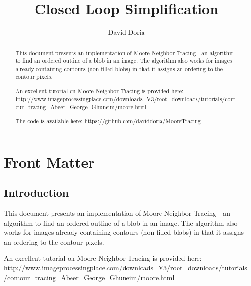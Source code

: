 \documentclass{InsightArticle}
\title{Closed Loop Simplification}
\author{David Doria}
\newcommand{\IJhandlerIDnumber}{3302}
\begin{document}
\IJhandlefooter{\IJhandlerIDnumber}


\ifpdf
\else
\fi


\maketitle


\ifhtml
\chapter*{Front Matter\label{front}}
\fi

\begin{abstract}
\noindent

This document presents an implementation of Moore Neighbor Tracing - an algorithm to find an ordered outline of a blob in an image. The algorithm also works for images already containing contours (non-filled blobs) in that it assigns an ordering to the contour pixels.

An excellent tutorial on Moore Neighbor Tracing is provided here:
http://www.imageprocessingplace.com/downloads_V3/root_downloads/tutorials/contour_tracing_Abeer_George_Ghuneim/moore.html


The code is available here:
https://github.com/daviddoria/MooreTracing

\end{abstract}

\IJhandlenote{\IJhandlerIDnumber}

\tableofcontents
\section{Introduction}
This document presents an implementation of Moore Neighbor Tracing - an algorithm to find an ordered outline of a blob in an image. The algorithm also works for images already containing contours (non-filled blobs) in that it assigns an ordering to the contour pixels.

An excellent tutorial on Moore Neighbor Tracing is provided here:
http://www.imageprocessingplace.com/downloads_V3/root_downloads/tutorials/contour_tracing_Abeer_George_Ghuneim/moore.html
\end{document}
